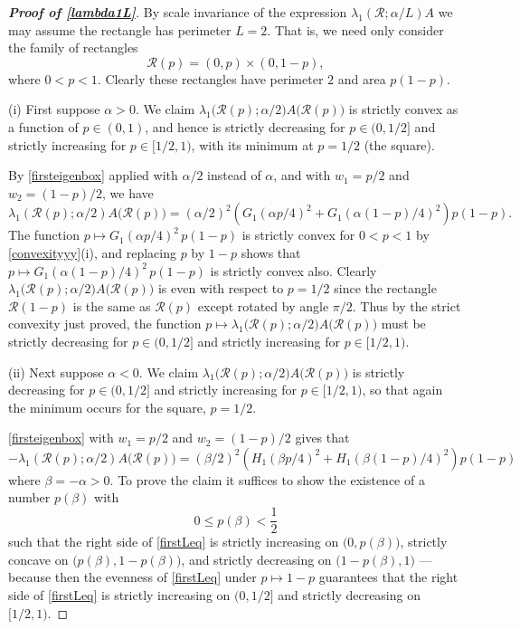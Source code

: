 \documentclass[12pt,reqno]{amsart}
\theoremstyle{definition}
\newcommand{\go}{G_1}
\newcommand{\ho}{H_1}
\begin{document}
%
\begin{proof}[\bf Proof of \autoref{lambda1L}]
By scale invariance of the expression $\lambda_1(\mathcal{R};\alpha/L)A$ we may assume the rectangle has perimeter $L=2$. That is, we need only consider the family of rectangles 
\[
\mathcal{R}(p) = (0,p) \times (0,1-p) ,
\]
where $0 < p < 1$. Clearly these rectangles have perimeter $2$ and area $p(1-p)$.

(i) First suppose $\alpha>0$. We claim $\lambda_1 \big( \mathcal{R}(p);\alpha/2 \big) A \big( \mathcal{R}(p) \big)$ is strictly convex as a function of $p \in (0,1)$, and hence is strictly decreasing for $p \in (0,1/2]$ and strictly increasing for $p \in [1/2,1)$, with its minimum at $p=1/2$ (the square).

By \autoref{firsteigenbox} applied with $\alpha/2$ instead of $\alpha$, and with ${w_1}=p/2$ and ${w_2}=(1-p)/2$, we have 
\[
\lambda_1(\mathcal{R}(p);\alpha/2) A \big( \mathcal{R}(p) \big) = (\alpha/2)^2 \left( \go(\alpha p/4)^2 + \go(\alpha (1-p)/4)^2 \right) p(1-p) .
\]
The function $p \mapsto \go(\alpha p/4)^2 \, p(1-p)$ is strictly convex for $0<p<1$ by \autoref{convexityyy}(i), and replacing $p$ by $1-p$ shows that $p \mapsto \go(\alpha (1-p)/4)^2 \, p(1-p)$ is strictly convex also. Clearly $\lambda_1 \big( \mathcal{R}(p);\alpha/2 \big) A \big( \mathcal{R}(p) \big)$ is even with respect to $p=1/2$ since the rectangle $\mathcal{R}(1-p)$ is the same as $\mathcal{R}(p)$ except rotated by angle $\pi/2$. Thus by the strict convexity just proved, the function $p \mapsto \lambda_1 \big( \mathcal{R}(p);\alpha/2 \big) A \big( \mathcal{R}(p) \big)$ must be strictly decreasing for $p \in (0,1/2]$ and strictly increasing for $p \in [1/2,1)$. 

(ii) Next suppose $\alpha<0$. We claim $\lambda_1 \big( \mathcal{R}(p);\alpha/2 \big) A \big( \mathcal{R}(p) \big)$ is strictly decreasing for $p \in (0,1/2]$ and strictly increasing for $p \in [1/2,1)$, so that again the minimum occurs for the square, $p=1/2$. 

\autoref{firsteigenbox} with ${w_1}=p/2$ and ${w_2}=(1-p)/2$ gives that  
%
\begin{equation} \label{firstLeq}
-\lambda_1(\mathcal{R}(p);\alpha/2) A \big( \mathcal{R}(p) \big) = (\beta/2)^2 \left( \ho(\beta p/4)^2 + \ho(\beta (1-p)/4)^2 \right) p(1-p)
\end{equation}
%
where $\beta=-\alpha>0$. To prove the claim it suffices to show the existence of a number $p(\beta)$ with 
\[
0 \leq p(\beta) < \frac{1}{2} 
\]
such that the right side of \eqref{firstLeq} is strictly increasing on $\big( 0, p(\beta) \big)$, strictly concave on $\big( p(\beta),1-p(\beta) \big)$, and strictly decreasing on $\big( 1-p(\beta) , 1\big)$ --- because then the evenness of \eqref{firstLeq} under $p \mapsto 1-p$ guarantees that the right side of \eqref{firstLeq} is strictly increasing on $(0,1/2]$ and strictly decreasing on $[1/2,1)$. 


\end{proof}
\end{document}
